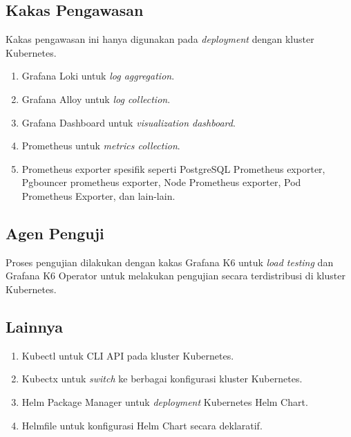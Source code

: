 \subsection{Kakas Pengawasan}

Kakas pengawasan ini hanya digunakan pada \textit{deployment} dengan kluster Kubernetes.

\begin{enumerate}
    \item Grafana Loki untuk \textit{log aggregation}.
    \item Grafana Alloy untuk \textit{log collection}.
    \item Grafana Dashboard untuk \textit{visualization dashboard}.
    \item Prometheus untuk \textit{metrics collection}.
    \item Prometheus exporter spesifik seperti PostgreSQL Prometheus exporter, Pgbouncer prometheus exporter, Node Prometheus exporter, Pod Prometheus Exporter, dan lain-lain.
\end{enumerate}

\subsection{Agen Penguji}

Proses pengujian dilakukan dengan kakas Grafana K6 untuk \textit{load testing} dan Grafana K6 Operator untuk melakukan pengujian secara terdistribusi di kluster Kubernetes.

\subsection{Lainnya}

\begin{enumerate}
    \item Kubectl untuk CLI API pada kluster Kubernetes.
    \item Kubectx untuk \textit{switch} ke berbagai konfigurasi kluster Kubernetes.
    \item Helm Package Manager untuk \textit{deployment} Kubernetes Helm Chart.
    \item Helmfile untuk konfigurasi Helm Chart secara deklaratif.
\end{enumerate}